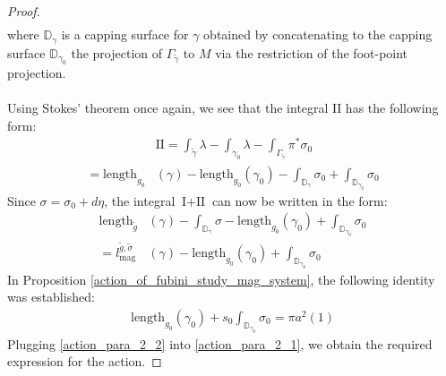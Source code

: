 \documentclass[11pt]{amsart}
\theoremstyle{plain}
\theoremstyle{definition}
\theoremstyle{remark}
\begin{document}
\begin{proof}
\begin{align}
\end{align}
where $\mathbb{D}_\gamma$ is a capping surface for $\gamma$ obtained by concatenating to the capping surface $\mathbb{D}_{\gamma_0}$ the projection of $\Gamma_{\tilde \gamma}$ to $M$ via the restriction of the foot-point projection.\\
\\
Using Stokes' theorem once again, we see that the integral $\text{II}$ has the following form:
\begin{align}
  &\text{II}=  \int_{\tilde \gamma}  \lambda - \int_{\dot \gamma_{0}}  \lambda - \int_{\Gamma_{\tilde \gamma}}  \pi^*\sigma_{0}\\\nonumber = 
 \text{length}_{g_0}&(\gamma) -  \text{length}_{g_0}(\gamma_{0}) - \int_{\mathbb{D}_{\gamma}} \sigma_{0} + \int_{\mathbb{D}_{\gamma_{0}}} \sigma_{0}  
\end{align}
Since $\sigma = \sigma_{0} + d\eta$, the integral $\text{I} + \text{II}$ can now be written in the form:
\begin{align}\label{action_para_2_1}
 \text{length}_{\tilde g}&(\gamma) - \int_{\mathbb{D}_{\gamma}} \sigma -  \text{length}_{g_0}(\gamma_{0}) + \int_{\mathbb{D}_{\gamma_0}} \sigma_{0} \\\nonumber
= l^{\tilde g,\tilde \sigma}_{\text{mag}}&(\gamma) - \text{length}_{g_0}(\gamma_{0}) + \int_{\mathbb{D}_{\gamma_{0}}} \sigma_{0}  
\end{align}
 In Proposition \ref{action_of_fubini_study_mag_system}, the following identity was established:
\begin{align}\label{action_para_2_2}
 \text{length}_{g_0}(\gamma_{0}) + s_0\int_{\mathbb{D}_{\gamma_{0}}} \sigma_{0} = \pi a^2(1)
\end{align}
Plugging \eqref{action_para_2_2} into \eqref{action_para_2_1}, we obtain the required expression for the action. 
\end{proof}
\end{document}
